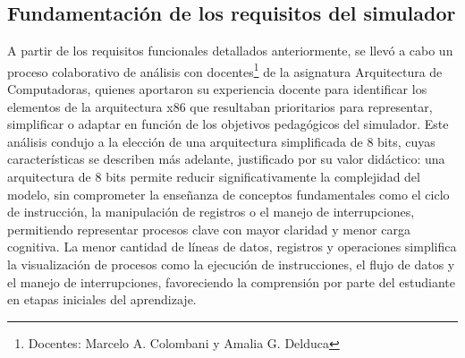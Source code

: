 \documentclass[12pt,oneside]{templates/unerthesis}
\begin{document}
\begin{table}[!h]
\centering
\caption{\label{tab:requisitosresumen}Resumen de requisitos funcionales y su fundamentación pedagógica}
\centering
{}
\end{table}

\hypertarget{fundamentaciuxf3n-de-los-requisitos-del-simulador}{%
\subsection{Fundamentación de los requisitos del simulador}\label{fundamentaciuxf3n-de-los-requisitos-del-simulador}}

A partir de los requisitos funcionales detallados anteriormente, se llevó a cabo un proceso colaborativo de análisis con docentes\footnote{Docentes: Marcelo A. Colombani y Amalia G. Delduca} de la asignatura Arquitectura de Computadoras, quienes aportaron su experiencia docente para identificar los elementos de la arquitectura x86 que resultaban prioritarios para representar, simplificar o adaptar en función de los objetivos pedagógicos del simulador. Este análisis condujo a la elección de una arquitectura simplificada de 8 bits, cuyas características se describen más adelante, justificado por su valor didáctico: una arquitectura de 8 bits permite reducir significativamente la complejidad del modelo, sin comprometer la enseñanza de conceptos fundamentales como el ciclo de instrucción, la manipulación de registros o el manejo de interrupciones, permitiendo representar procesos clave con mayor claridad y menor carga cognitiva. La menor cantidad de líneas de datos, registros y operaciones simplifica la visualización de procesos como la ejecución de instrucciones, el flujo de datos y el manejo de interrupciones, favoreciendo la comprensión por parte del estudiante en etapas iniciales del aprendizaje.
\end{document}
